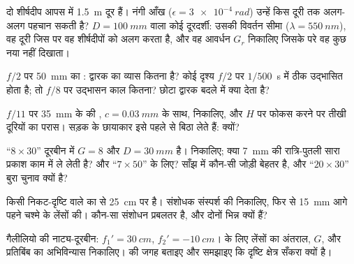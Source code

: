\begin{exercise}[$\star\star$]\label{exo:b1:optical-instruments:6}
दो शीर्षदीप आपस में \qty{1.5}{m} दूर हैं। नंगी आँख
($\epsilon = \qty{3e-4}{rad}$) उन्हें किस दूरी तक अलग-अलग पहचान सकती है?
$D = \qty{100}{mm}$ वाला कोई दूरदर्शी: उसकी विवर्तन सीमा ($\lambda =
\qty{550}{nm}$), वह दूरी जिस पर वह शीर्षदीपों को अलग करता है, और वह आवर्धन
$G_r$ निकालिए जिसके परे वह कुछ नया नहीं दिखाता।
\end{exercise}

\begin{exercise}[$\star\star$]\label{exo:b1:optical-instruments:7}
$f/2$ पर \qty{50}{mm} का : द्वारक का व्यास कितना है? कोई दृश्य $f/2$ पर
$1/500$~\unit{s} में ठीक उद्भासित होता है; तो $f/8$ पर उद्भासन काल कितना?
छोटा द्वारक बदले में क्या देता है?
\end{exercise}

\begin{exercise}[$\star\star$]\label{exo:b1:optical-instruments:8}
$f/11$ पर \qty{35}{mm} के  की , $c = \qty{0.03}{mm}$ के साथ,
निकालिए, और $H$ पर फोकस करने पर तीखी दूरियों का परास। सड़क के छायाकार इसे पहले
से बिठा लेते हैं: क्यों?
\end{exercise}

\begin{exercise}[$\star\star$]\label{exo:b1:optical-instruments:9}
``$8\times30$'' दूरबीन में $G = 8$ और $D = \qty{30}{mm}$ है। 
निकालिए; क्या \qty{7}{mm} की रात्रि-पुतली सारा प्रकाश काम में ले लेती है?
और ``$7\times50$'' के लिए? साँझ में कौन-सी जोड़ी बेहतर है, और ``$20\times30$''
बुरा चुनाव क्यों है?
\end{exercise}

\begin{exercise}[$\star\star\star$]\label{exo:b1:optical-instruments:10}
किसी निकट-दृष्टि वाले का   से \qty{25}{cm} पर है। संशोधक
संस्पर्श  की  निकालिए, फिर  से \qty{15}{mm} आगे पहने चश्मे
के लेंसों की। कौन-सा संशोधन प्रबलतर है, और दोनों भिन्न क्यों हैं?
\end{exercise}

\begin{exercise}[$\star\star\star$]\label{exo:b1:optical-instruments:11}
गैलीलियो की नाट्य-दूरबीन: $f_1' = \qty{30}{cm}$, $f_2' = \qty{-10}{cm}$।
 के लिए लेंसों का अंतराल, $G$, और प्रतिबिंब का अभिविन्यास
निकालिए।  की जगह बताइए और समझाइए कि दृष्टि क्षेत्र सँकरा क्यों है।
\end{exercise}

